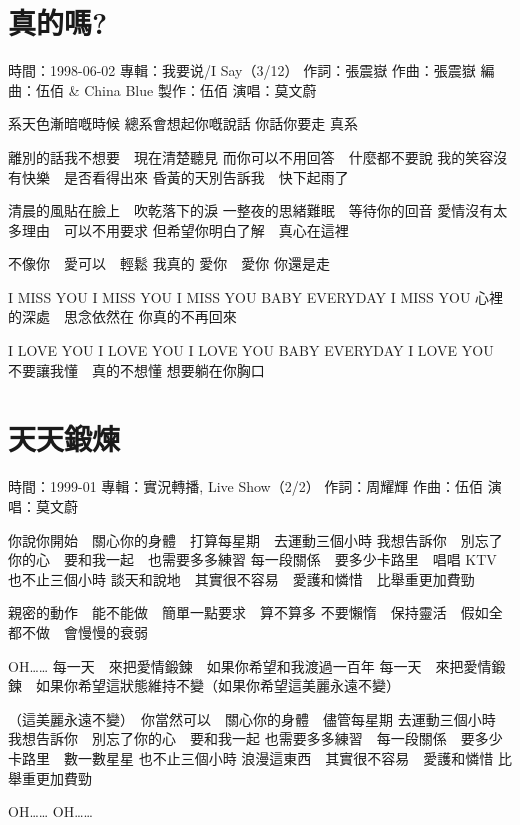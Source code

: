 \documentclass[UTF8,a4paper,oneside,twocolumn,12pt]{ctexbook}
\newcommand{\infopair}[2]{\textbullet #1：#2}
\newcommand{\zc}[1][伍佰]{\infopair{作詞}{#1}}
\newcommand{\zq}[1][伍佰]{\infopair{作曲}{#1}}
\newcommand{\bq}[1][伍佰]{\infopair{編曲}{#1}}
\newcommand{\zj}[1]{\infopair{專輯}{#1}}
\newcommand{\zz}[1]{\infopair{製作}{#1}}
\newcommand{\sj}[1]{\infopair{時間}{#1}}
\newenvironment{info}{\begin{flushleft}\kaishu
	}
	{\end{flushleft}\normalsize\yahei\par}
\newenvironment{lyric}{
	}
{}
\begin{document}
\section{真的嗎?}
\begin{info}
	\sj{1998-06-02}
	\zj{我要说/I Say（3/12）}
	\zc[張震嶽]
	\zq[張震嶽]
	\bq[伍佰 \& China Blue]
	\zz{伍佰}
	\infopair{演唱}{莫文蔚}
\end{info}
\begin{lyric}
	系天色漸暗嘅時候 總系會想起你嘅說話
	你話你要走 真系

	離別的話我不想要　現在清楚聽見
	而你可以不用回答　什麼都不要說
	我的笑容沒有快樂　是否看得出來
	昏黃的天別告訴我　快下起雨了

	清晨的風貼在臉上　吹乾落下的淚
	一整夜的思緒難眠　等待你的回音
	愛情沒有太多理由　可以不用要求
	但希望你明白了解　真心在這裡

	不像你　愛可以　輕鬆
	我真的 愛你　愛你  你還是走

	I MISS YOU  I MISS YOU  I MISS YOU
	BABY EVERYDAY I MISS YOU
	心裡的深處　思念依然在  你真的不再回來

	I LOVE YOU  I LOVE YOU  I LOVE YOU
	BABY EVERYDAY I LOVE YOU
	不要讓我懂　真的不想懂  想要躺在你胸口
\end{lyric}

\section{天天鍛煉}
\begin{info}
	\sj{1999-01}
	\zj{實況轉播, Live Show（2/2）}
	\zc[周耀輝]
	\zq
	\infopair{演唱}{莫文蔚}
\end{info}
\begin{lyric}
	你說你開始　關心你的身體　打算每星期　去運動三個小時
	我想告訴你　別忘了你的心　要和我一起　也需要多多練習
	每一段關係　要多少卡路里　唱唱 KTV  也不止三個小時
	談天和說地　其實很不容易　愛護和憐惜　比舉重更加費勁

	親密的動作　能不能做　簡單一點要求　算不算多
	不要懶惰　保持靈活　假如全都不做　會慢慢的衰弱

	OH…… 每一天　來把愛情鍛鍊　如果你希望和我渡過一百年
	每一天　來把愛情鍛鍊　如果你希望這狀態維持不變（如果你希望這美麗永遠不變）

	（這美麗永遠不變）　你當然可以　關心你的身體　儘管每星期
	去運動三個小時　我想告訴你　別忘了你的心　要和我一起
	也需要多多練習　每一段關係　要多少卡路里　數一數星星
	也不止三個小時  浪漫這東西　其實很不容易　愛護和憐惜
	比舉重更加費勁

	OH……  OH……
\end{lyric}
\end{document}
